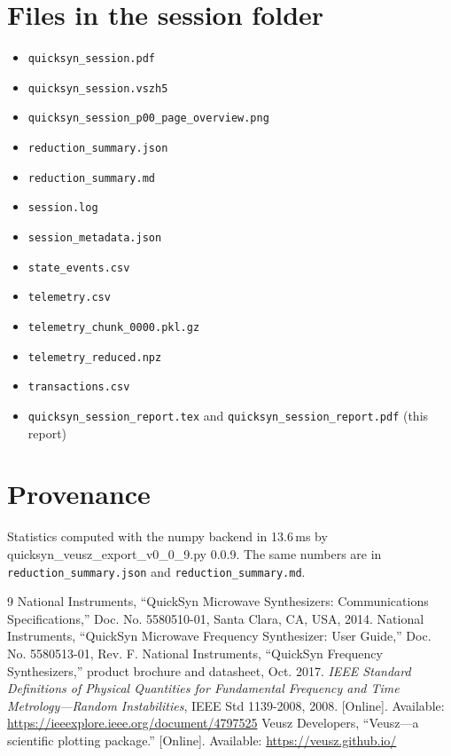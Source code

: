 \documentclass[11pt]{article}
\begin{document}
\section{Files in the session folder}

\begin{itemize}
  \item \texttt{quicksyn\_session.pdf}
  \item \texttt{quicksyn\_session.vszh5}
  \item \texttt{quicksyn\_session\_p00\_page\_overview.png}
  \item \texttt{reduction\_summary.json}
  \item \texttt{reduction\_summary.md}
  \item \texttt{session.log}
  \item \texttt{session\_metadata.json}
  \item \texttt{state\_events.csv}
  \item \texttt{telemetry.csv}
  \item \texttt{telemetry\_chunk\_0000.pkl.gz}
  \item \texttt{telemetry\_reduced.npz}
  \item \texttt{transactions.csv}
  \item \texttt{quicksyn\_session\_report.tex} and \texttt{quicksyn\_session\_report.pdf} (this report)
\end{itemize}

\section{Provenance}

Statistics computed with the numpy backend in
13.6\,ms by quicksyn\_veusz\_export\_v0\_0\_9.py 0.0.9. The same numbers are
in \texttt{reduction\_summary.json} and \texttt{reduction\_summary.md}.

{}
\begin{thebibliography}{9}
 National Instruments, ``QuickSyn Microwave Synthesizers:
  Communications Specifications,'' Doc. No. 5580510-01, Santa Clara, CA, USA, 2014.
 National Instruments, ``QuickSyn Microwave Frequency
  Synthesizer: User Guide,'' Doc. No. 5580513-01, Rev. F.
 National Instruments, ``QuickSyn Frequency Synthesizers,''
  product brochure and datasheet, Oct. 2017.
 \emph{IEEE Standard Definitions of Physical Quantities for
  Fundamental Frequency and Time Metrology---Random Instabilities}, IEEE Std
  1139-2008, 2008. [Online]. Available: \url{https://ieeexplore.ieee.org/document/4797525}
 Veusz Developers, ``Veusz---a scientific plotting package.''
  [Online]. Available: \url{https://veusz.github.io/}
\end{thebibliography}
\end{document}
